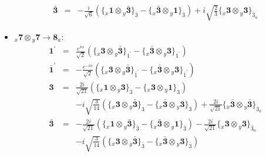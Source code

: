 \documentclass[english]{article}
\newcommand{\rep}[1]{\mathbf{#1}}
\newcommand{\repx}[2]{{}_{#2}\mathbf{#1}}
\newcommand{\subcg}[3]{\big\{ \repx{#1}{x}\otimes\repx{#2}{y}\big\}^{}_{#3}}
\begin{document}
\begin{itemize}
\begin{eqnarray*}
\\
\rep{\bar{3}} &=& -\frac{i}{\sqrt{6}}\left(\subcg{1}{\bar{3}}{\bar{3}}-\subcg{\bar{3}}{1}{\bar{3}}\right)+i \sqrt{\frac{2}{3}}\subcg{3}{3}{\bar{3}_{a}}
\end{eqnarray*}
\item $\repx{7}{x}\otimes\repx{7}{y}\to\rep{8}_{a}$:
\begin{eqnarray*}
\rep{1^{\prime}} &=& \frac{e^{i \alpha }}{\sqrt{2}}\left(\subcg{3}{\bar{3}}{1^{\prime}}-\subcg{\bar{3}}{3}{1^{\prime}}\right)
\\
\rep{\bar{1}^{\prime}} &=& -\frac{e^{-i \alpha }}{\sqrt{2}}\left(\subcg{3}{\bar{3}}{\bar{1}^{\prime}}-\subcg{\bar{3}}{3}{\bar{1}^{\prime}}\right)
\\
\rep{3} &=& \frac{2 i}{\sqrt{21}}\left(\subcg{1}{3}{3}-\subcg{3}{1}{3}\right) \\ 
 & & -i \sqrt{\frac{3}{14}}\left(\subcg{3}{\bar{3}}{3}-\subcg{\bar{3}}{3}{3}\right)+\frac{2 i}{\sqrt{21}}\subcg{\bar{3}}{\bar{3}}{3_{a}}
\\
\rep{\bar{3}} &=& -\frac{2 i}{\sqrt{21}}\left(\subcg{1}{\bar{3}}{\bar{3}}-\subcg{\bar{3}}{1}{\bar{3}}\right)-\frac{2 i}{\sqrt{21}}\subcg{3}{3}{\bar{3}_{a}} \\ 
 & & -i \sqrt{\frac{3}{14}}\left(\subcg{3}{\bar{3}}{\bar{3}}-\subcg{\bar{3}}{3}{\bar{3}}\right)
\end{eqnarray*}
\end{itemize}
\end{document}
